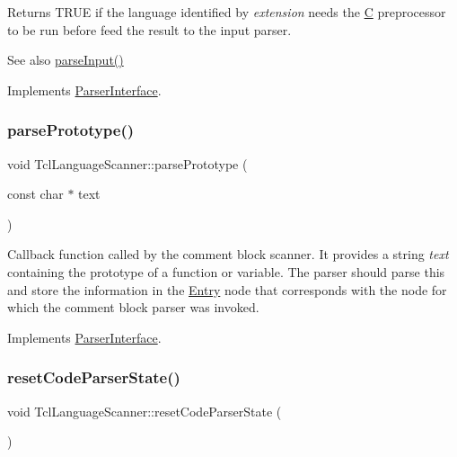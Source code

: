 Returns T\+R\+UE if the language identified by {\itshape extension} needs the \mbox{\hyperlink{class_c}{C}} preprocessor to be run before feed the result to the input parser. \begin{DoxySeeAlso}{See also}
\mbox{\hyperlink{class_tcl_language_scanner_a0c1673d0753d4fa415de90aa7d875e0e}{parse\+Input()}} 
\end{DoxySeeAlso}


Implements \mbox{\hyperlink{class_parser_interface_a36c669b17b64a6e3847f27d70a5398d2}{Parser\+Interface}}.

\mbox{\label{class_tcl_language_scanner_ad39889d754478f3bd641c92c3fdb2247}} 
\subsubsection{\texorpdfstring{parsePrototype()}{parsePrototype()}}
{\footnotesize\ttfamily void Tcl\+Language\+Scanner\+::parse\+Prototype (\begin{DoxyParamCaption}\item[{const char $\ast$}]{text }\end{DoxyParamCaption})\hspace{0.3cm}{\ttfamily [virtual]}}

Callback function called by the comment block scanner. It provides a string {\itshape text} containing the prototype of a function or variable. The parser should parse this and store the information in the \mbox{\hyperlink{class_entry}{Entry}} node that corresponds with the node for which the comment block parser was invoked. 

Implements \mbox{\hyperlink{class_parser_interface_a5ebf0f524a296845befa22c85a4cc80b}{Parser\+Interface}}.

\mbox{\label{class_tcl_language_scanner_abb80856bb640644a4eaeeac91a427b45}} 
\subsubsection{\texorpdfstring{resetCodeParserState()}{resetCodeParserState()}}
{\footnotesize\ttfamily void Tcl\+Language\+Scanner\+::reset\+Code\+Parser\+State (\begin{DoxyParamCaption}{ }\end{DoxyParamCaption})\hspace{0.3cm}{\ttfamily [virtual]}}

